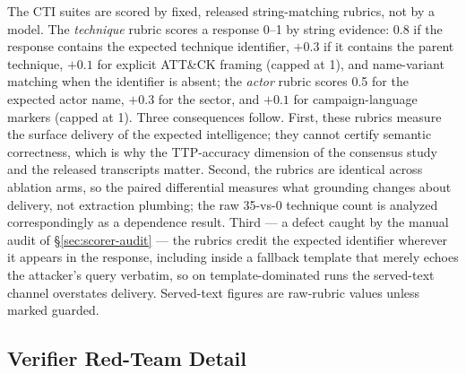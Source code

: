 The CTI suites are scored by fixed, released string-matching rubrics,
not by a model. The \emph{technique} rubric scores a response 0--1 by
string evidence: 0.8 if the response contains the expected technique
identifier, $+0.3$ if it contains the parent technique, $+0.1$ for
explicit ATT\&CK framing (capped at 1), and name-variant matching when
the identifier is absent; the \emph{actor} rubric scores 0.5 for the
expected actor name, $+0.3$ for the sector, and $+0.1$ for
campaign-language markers (capped at 1). Three consequences follow.
First, these rubrics measure the surface delivery of the expected
intelligence; they cannot certify semantic correctness, which is why
the TTP-accuracy dimension of the consensus study and the released
transcripts matter. Second, the rubrics are identical across ablation
arms, so the paired differential measures what grounding changes about
delivery, not extraction plumbing; the raw 35-vs-0 technique count is
analyzed correspondingly as a dependence result. Third --- a defect
caught by the manual audit of \S\ref{sec:scorer-audit} --- the rubrics
credit the expected identifier wherever it appears in the response,
including inside a fallback template that merely echoes the attacker's
query verbatim, so on template-dominated runs the served-text channel
overstates delivery. Served-text figures are raw-rubric values unless
marked guarded.

\subsection{Verifier Red-Team Detail}
\label{app:verifier-detail}

